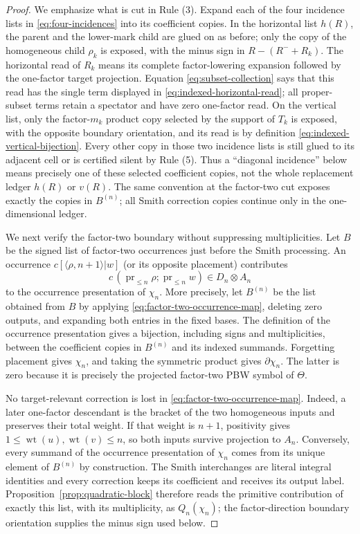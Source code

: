 \documentclass[11pt]{amsart}
\theoremstyle{remark}
\newcommand{\pr}{\operatorname{pr}}
\begin{document}
\begin{proof}
	We emphasize what is cut in Rule (3).  Expand each of the four incidence
	lists in \eqref{eq:four-incidences} into its coefficient copies.  In the
	horizontal list $h(R)$, the parent and the lower-mark child are glued on
	as before; only the copy of the homogeneous child $\rho_k$ is exposed,
	with the minus sign in
	$R-(R^-+R_k)$.  The horizontal read of $R_k$ means its complete
	factor-lowering expansion followed by the one-factor target projection.
	Equation \eqref{eq:subset-collection} says that this read has the single
	term displayed in \eqref{eq:indexed-horizontal-read}; all proper-subset
	terms retain a spectator and have zero one-factor read.  On the vertical
	list, only the factor-$m_k$ product copy selected by the support of $T_k$
	is exposed, with the opposite boundary orientation, and its read is by
	definition \eqref{eq:indexed-vertical-bijection}.  Every other copy in
	those two incidence lists is still
	glued to its adjacent cell or is certified silent by Rule (5).  Thus a
	``diagonal incidence'' below means precisely one of these selected
	coefficient copies, not the whole replacement ledger $h(R)$ or $v(R)$.
	The same convention at the factor-two cut exposes exactly the copies in
	$B^{(n)}$; all Smith correction copies continue only in the
	one-dimensional ledger.

	We next verify the factor-two boundary without suppressing
	multiplicities.  Let $B$ be the signed list of factor-two occurrences
	just before the Smith processing.  An occurrence
	$c[\langle\rho,n+1\rangle|w]$ (or its opposite placement) contributes
	\begin{equation}\label{eq:factor-two-occurrence-map}
	 c\,(\pr_{\leq n}\rho;\pr_{\leq n}w)
	 \in D_n\otimes A_n
	\end{equation}
	to the occurrence presentation of $\chi_n$.  More precisely, let
	$B^{(n)}$ be the list obtained from $B$ by applying
	\eqref{eq:factor-two-occurrence-map}, deleting zero outputs, and
	expanding both entries in the fixed bases.  The definition of the
	occurrence presentation gives a bijection, including signs and
	multiplicities, between the coefficient copies in $B^{(n)}$ and its
	indexed summands.  Forgetting placement gives
	$\chi_n$, and taking the symmetric product gives $\partial\chi_n$.
	The latter is zero because it is precisely the projected factor-two PBW
	symbol of $\Theta$.

	No target-relevant correction is lost in
	\eqref{eq:factor-two-occurrence-map}.  Indeed, a later one-factor
	descendant is the bracket of the two homogeneous inputs and preserves
	their total weight.  If that weight is $n+1$, positivity gives
	$1\leq\operatorname{wt}(u),\operatorname{wt}(v)\leq n$, so both inputs
	survive projection to $A_n$.  Conversely, every summand of the
	occurrence presentation of $\chi_n$ comes from its unique element of
	$B^{(n)}$ by construction.  The Smith interchanges are literal integral
	identities and every correction keeps its coefficient and receives its
	output label.  Proposition~\ref{prop:quadratic-block} therefore reads
	the primitive contribution of exactly this list, with its multiplicity,
	as $Q_n(\chi_n)$; the factor-direction boundary orientation supplies
	the minus sign used below.


\end{proof}
\end{document}

